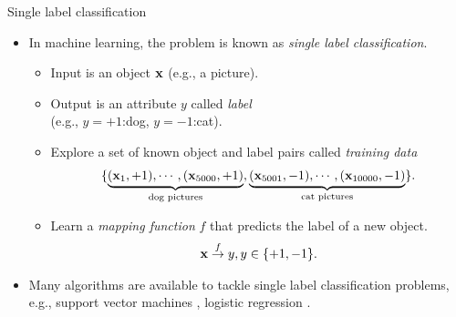 \documentclass[first=purple,second=dgreen,logo=redexc]{aaltoslides}
\begin{document}
{\begin{frame}{Single label classification}
	\begin{itemize}
		\item In machine learning, the problem is known as \textit{single label classification}.
		\begin{itemize}
			\footnotesize
			\item Input is an object $\mathbf {x}$ (e.g., a picture).
			\item Output is an attribute $y$ called \textit{label}\\ (e.g., $y=+1$:dog, $y=-1$:cat).
			\item Explore a set of known object and label pairs called \textit{training data}
			\begin{align*}
				\{\underbrace{(\mathbf {x}_1,+1),\cdots,(\mathbf {x}_{5000},+1)}_{\text{dog pictures}},\underbrace{(\mathbf {x}_{5001},-1),\cdots, (\mathbf {x}_{10000},-1)}_{\text{cat pictures}}\}.
			\end{align*}
			\item Learn a \textit{mapping function} $f$ that predicts the label of a new object.
			\begin{align*}
				\mathbf {x}\overset{f}{\rightarrow}y,y\in\{+1,-1\}.
			\end{align*}
		\end{itemize}
		\item Many algorithms are available to tackle single label classification problems, e.g., support vector machines \citep{Cortes95support}, logistic regression \citep{Chen99}.
	\end{itemize}
\end{frame}


}
\end{document}
